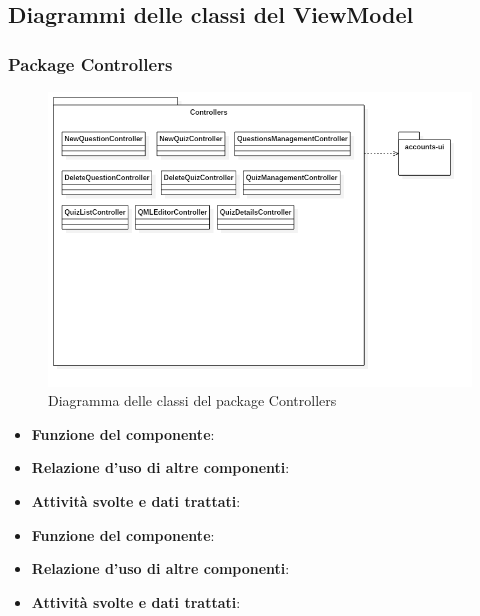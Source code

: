 \subsection{Diagrammi delle classi del ViewModel}
\subsubsection{Package Controllers}
\begin{figure}[h!]
	\begin{center}
		\includegraphics[scale=0.6]{../images/ControllersClass.png}
		\caption{Diagramma delle classi del package Controllers}
	\end{center}
\end{figure}


\begin{itemize}
	\item\textbf{Funzione del componente}: 
	\item\textbf{Relazione d'uso di altre componenti}: 
	\item\textbf{Attività svolte e dati trattati}:
\end{itemize}


\begin{itemize}
	\item\textbf{Funzione del componente}: 
	\item\textbf{Relazione d'uso di altre componenti}: 
	\item\textbf{Attività svolte e dati trattati}:
\end{itemize}

